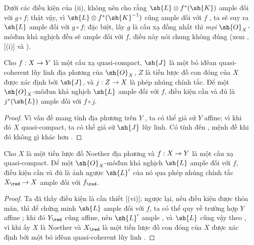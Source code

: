\documentclass[oneside,10pt]{amsart}
\makeatletter
\newcommand{\ega@arrow}[2]{\mathchoice{#1}{#2}{#2}{#2}}
\renewcommand{\to}{\ega@arrow{\longrightarrow}{\rightarrow}}
\let\EGAOriginalLabel\label
\renewcommand{\label}[1]{\phantomsection\EGAOriginalLabel{#1}}
\makeatother
\begin{document}
\begin{remark}[4.6.14]
\label{II.4.6.14}
Dưới các điều kiện của (ii), không nên cho rằng $\sh{L}\otimes f^*(\sh{K})$ ample đối với $g\circ f$;
thật vậy, vì $\sh{L}\otimes f^*(\sh{K}^{-1})$ cũng ample đối với $f$ , ta sẽ suy ra $\sh{L}$ ample đối với $g\circ f$;
đặc biệt, lấy $g$ là cấu xạ đồng nhất thì \emph{mọi} $\sh{O}_X$-môđun khả nghịch đều sẽ ample đối với $f$, điều này nói chung không đúng (xem , [(i)] và ).
\end{remark}

\begin{proposition}[4.6.15]
\label{II.4.6.15}
Cho $f:X\to Y$ là một cấu xạ quasi-compact, $\sh{J}$ là một bó iđêan quasi-coherent lũy linh địa phương của $\sh{O}_X$, $Z$ là tiền lược đồ con đóng của $X$ được xác định bởi $\sh{J}$, và $j:Z\to X$ là phép nhúng chính tắc.
Để một $\sh{O}_X$-môđun khả nghịch $\sh{L}$ ample đối với $f$, điều kiện cần và đủ là $j^*(\sh{L})$ ample đối với $f\circ j$.
\end{proposition}

\begin{proof}
Vì vấn đề mang tính địa phương trên $Y$ , ta có thể giả sử $Y$ affine;
vì khi đó $X$ quasi-compact, ta có thể giả sử $\sh{J}$ lũy linh.
Có tính đến , mệnh đề khi đó không gì khác hơn .
\end{proof}

\begin{corollary}[4.6.16]
\label{II.4.6.16}
Cho $X$ là một tiền lược đồ Noether địa phương và $f:X\to Y$ là một cấu xạ quasi-compact.
Để một $\sh{O}_X$-môđun khả nghịch $\sh{L}$ ample đối với $f$, điều kiện cần và đủ là ảnh ngược $\sh{L}'$ của nó qua phép nhúng chính tắc $X_\red\to X$ ample đối với $f_\red$.
\end{corollary}

\begin{proof}
Ta đã thấy điều kiện là cần thiết [(vi)];
ngược lại, nếu điều kiện được thỏa mãn, thì để chứng minh $\sh{L}$ ample đối với $f$, ta có thể quy về trường hợp $Y$ affine ;
khi đó $Y_\red$ cũng affine, nên $\sh{L}'$ ample , và $\sh{L}$ cũng vậy theo , vì khi ấy $X$ là Noether và $X_\red$ là một tiền lược đồ con đóng của $X$ được xác định bởi một bó iđêan quasi-coherent lũy linh .
\end{proof}
\end{document}

